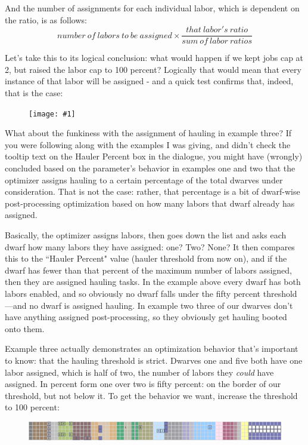 \documentclass[]{article}
\newcommand{\fullfigure}[1] {
\begin{figure}[h!]
\texttt{[image: \#1]}
\end{figure}
}
\begin{document}
And the number of assignments for each individual labor, which is dependent on the ratio, is as follows:
\begin{displaymath}
number\:of\:labors\:to\:be\:assigned \times \frac{that\:labor's\:ratio}{sum\:of\:labor\:ratios}
\end{displaymath}

Let's take this to its logical conclusion: what would happen if we kept jobs cap at 2, but raised the
labor cap to 100 percent? Logically that would mean that every instance of that labor will be assigned -
and a quick test confirms that, indeed, that is the case:
\fullfigure{Sec4Fig13}

What about the funkiness with the assignment of hauling in example three? If you were following along
with the examples I was giving, and didn't check the tooltip text on the Hauler Percent box in the
dialogue, you might have (wrongly) concluded based on the parameter's behavior in examples one and two
that the optimizer assigns hauling to a certain percentage of the total dwarves under consideration. That
is not the case: rather, that percentage is a bit of dwarf-wise post-processing optimization based on how
many labors that dwarf already has assigned.

Basically, the optimizer assigns labors, then goes down the list and asks each dwarf how many labors they
have assigned: one? Two? None? It then compares this to the ``Hauler Percent" value (hauler threshold
from now on), and if the dwarf has fewer than that percent of the maximum number of labors assigned, then
they are assigned hauling tasks. In the example above every dwarf has both labors enabled, and so
obviously no dwarf falls under the fifty percent threshold---and no dwarf is assigned hauling. In example
two three of our dwarves don't have anything assigned post-processing, so they obviously get hauling
booted onto them.

Example three actually demonstrates an optimization behavior that's important to know: that the hauling
threshold is strict. Dwarves one and five both have one labor assigned, which is half of two, the number
of labors they \emph{could} have assigned. In percent form one over two is fifty percent: on the border
of our threshold, but not below it. To get the behavior we want, increase the threshold to 100 percent:
\begin{figure}[h!]
\centering
\includegraphics[width=\linewidth]{Sec4Fig14}
\end{figure}
\end{document}

